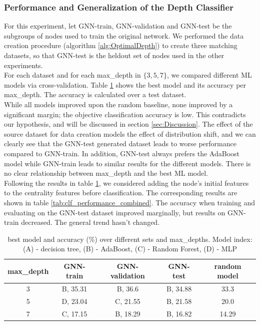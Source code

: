 \documentclass[11pt,a4paper]{article}
\begin{document}
	\subsubsection*{Performance and Generalization of the Depth Classifier}
	For this experiment, let GNN-train, GNN-validation and GNN-test be the subgroups of nodes used to train the original network. We performed the data creation procedure (algorithm \ref{alg:OptimalDepth}) to create three matching datasets, so that GNN-test is the heldout set of nodes used in the other experiments.\\
	For each dataset and for each max\_depth in $\{3, 5, 7\}$, we compared different ML models via cross-validation. Table \ref{tab:clf_performance} shows the best model and its accuracy per max\_depth. The accuracy is calculated over a test dataset.\\
	While all models improved upon the random baseline, none improved by a significant margin; the objective classification accuracy is low. This contradicts our hypothesis, and will be discussed in section \ref{sec:Discussion}. The effect of the source dataset for data creation models the effect of distribution shift, and we can clearly see that the GNN-test generated dataset leads to worse performance compared to GNN-train. In addition, GNN-test always prefers the AdaBoost model while GNN-train leads to similar results for the different models. There is no clear relationship between max\_depth and the best ML model.\\
	Following the results in table \ref{tab:clf_performance}, we considered adding the node's initial features to the centrality features before classification. The corresponding results are shown in table \ref{tab:clf_performance_combined}. The accuracy when training and evaluating on the GNN-test dataset improved marginally, but results on GNN-train decreased. The general trend hasn't changed.
	\begin{table}[t]
		\centering
		\begin{tabular}{c|cccc}
			\hline
			\textbf{max\_depth} & \textbf{GNN-train} & \textbf{GNN-validation} & \textbf{GNN-test} & \textbf{random model} \\
			\hline
			3 & B, 35.31 & B, 36.6 & B, 34.88 & 33.3 \\
			5 & D, 23.04 & C, 21.55 & B, 21.58 & 20.0 \\
			7 & C, 17.15 & B, 18.29 & B, 16.82 & 14.29 \\\hline
		\end{tabular}
		\caption{best model and accuracy (\%) over different sets and max\_depths. Model index: (A) - decision tree, (B) - AdaBoost, (C) - Random Forest, (D) - MLP}\label{tab:clf_performance}
	\end{table}
\end{document}
